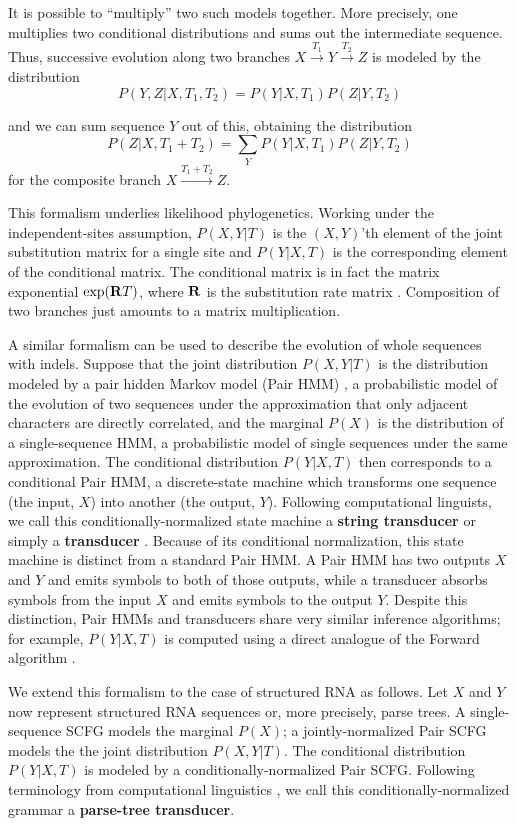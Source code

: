 \documentclass[10pt]{article}
\begin{document}
It is possible to ``multiply'' two such models together.
More precisely, one multiplies two conditional distributions and sums out the intermediate sequence.
Thus, successive evolution along two branches $X \stackrel{T_1}{\to} Y \stackrel{T_2}{\to} Z$
is modeled by the distribution
\[
P(Y,Z|X,T_1,T_2) = P(Y | X, T_1) P(Z | Y, T_2)
\]

and we can sum sequence $Y$ out of this, obtaining the distribution
\[
P(Z|X,T_1+T_2) = \sum_Y P(Y | X, T_1) P(Z | Y, T_2)
\]
for the composite branch
$X \stackrel{T_1 + T_2}{\longrightarrow} Z$.

This formalism underlies likelihood phylogenetics.
Working under the independent-sites assumption, $P (X, Y | T)$ is the $(X,Y)$'th element of the joint substitution matrix for a single site
and $P(Y | X, T)$ is the corresponding element of the conditional matrix.
The conditional matrix is in fact the matrix exponential
 $\exp({\bf R}T)$, where ${\bf R}$ is the substitution rate matrix \cite{HolmesRubin2002b}.
Composition of two branches just amounts to a matrix multiplication.

A similar formalism can be used to describe the evolution of whole
sequences with indels.
Suppose that the joint distribution $P (X, Y | T)$ is the distribution
modeled by a pair hidden Markov model (Pair HMM) \cite{Durbin98},
a probabilistic model of the evolution of two sequences under the
approximation that only adjacent characters are directly correlated,
and the marginal $P(X)$ is the distribution of a single-sequence HMM,
a probabilistic model of single sequences under the same approximation.
The conditional distribution $P(Y | X, T)$ then corresponds to a conditional Pair HMM,
a discrete-state machine which transforms one sequence (the input, $X$) into another (the output, $Y$).
Following computational linguists, we call this conditionally-normalized state machine a
 {\bf string transducer} or simply a {\bf transducer}
\cite{BradleyHolmes2007}.
Because of its conditional normalization, this state machine is
distinct from a standard Pair HMM.
A Pair HMM has two outputs $X$ and $Y$ and emits symbols to both of those outputs,
while a transducer absorbs symbols from the input $X$ and emits
symbols to the output $Y$.
Despite this distinction, Pair HMMs and transducers share very similar inference algorithms;
for example, $P(Y | X, T)$ is computed using a direct analogue of the Forward algorithm \cite{Durbin98}.

We extend this formalism to the case of structured RNA as follows.
Let $X$ and $Y$ now represent structured RNA sequences or, more
precisely, parse trees.
A single-sequence SCFG models the marginal $P(X)$;
a jointly-normalized Pair SCFG \cite{Durbin98} models the the joint distribution $P (X, Y | T)$.
The conditional distribution $P(Y | X, T)$ is modeled by a conditionally-normalized Pair SCFG.
Following terminology from computational linguistics
\cite{ComonEtAl2007-TreeTransducers}, we call this
conditionally-normalized grammar a {\bf parse-tree transducer}.
\end{document}
